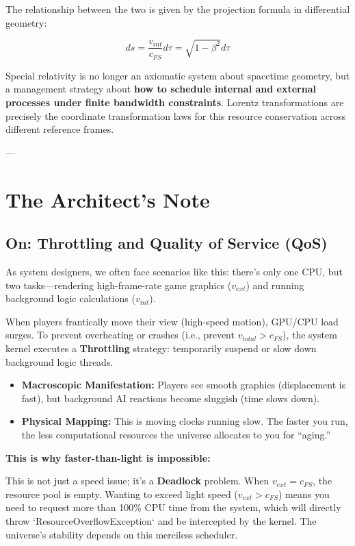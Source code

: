 The relationship between the two is given by the projection formula in differential geometry:

$$ds = \frac{v_{int}}{c_{FS}} d\tau = \sqrt{1 - \beta^2} d\tau$$

Special relativity is no longer an axiomatic system about spacetime geometry, but a management strategy about \textbf{how to schedule internal and external processes under finite bandwidth constraints}. Lorentz transformations are precisely the coordinate transformation laws for this resource conservation across different reference frames.

---

\section{The Architect's Note}

\subsection{On: Throttling and Quality of Service (QoS)}

As system designers, we often face scenarios like this: there's only one CPU, but two tasks---rendering high-frame-rate game graphics (\textbf{$v_{ext}$}) and running background logic calculations (\textbf{$v_{int}$}).

When players frantically move their view (high-speed motion), GPU/CPU load surges. To prevent overheating or crashes (i.e., prevent \textbf{$v_{total} > c_{FS}$}), the system kernel executes a \textbf{Throttling} strategy: temporarily suspend or slow down background logic threads.

\begin{itemize}
\item \textbf{Macroscopic Manifestation:} Players see smooth graphics (displacement is fast), but background AI reactions become sluggish (time slows down).

\item \textbf{Physical Mapping:} This is moving clocks running slow. The faster you run, the less computational resources the universe allocates to you for ``aging.''
\end{itemize}

\textbf{This is why faster-than-light is impossible:}

This is not just a speed issue; it's a \textbf{Deadlock} problem. When \textbf{$v_{ext} = c_{FS}$}, the resource pool is empty. Wanting to exceed light speed (\textbf{$v_{ext} > c_{FS}$}) means you need to request more than 100\% CPU time from the system, which will directly throw `ResourceOverflowException` and be intercepted by the kernel. The universe's stability depends on this merciless scheduler.

